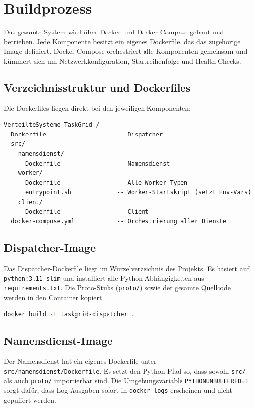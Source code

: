 \section{Buildprozess}
\label{sec:buildprozess}

Das gesamte System wird über Docker und Docker Compose gebaut und betrieben.
Jede Komponente besitzt ein eigenes Dockerfile, das das zugehörige Image definiert.
Docker Compose orchestriert alle Komponenten gemeinsam und kümmert sich um
Netzwerkkonfiguration, Startreihenfolge und Health-Checks.

\subsection{Verzeichnisstruktur und Dockerfiles}

Die Dockerfiles liegen direkt bei den jeweiligen Komponenten:

\begin{lstlisting}[language={},caption={Verzeichnisstruktur der Dockerfiles}]
VerteilteSysteme-TaskGrid-/
  Dockerfile                    -- Dispatcher
  src/
    namensdienst/
      Dockerfile                -- Namensdienst
    worker/
      Dockerfile                -- Alle Worker-Typen
      entrypoint.sh             -- Worker-Startskript (setzt Env-Vars)
    client/
      Dockerfile                -- Client
  docker-compose.yml            -- Orchestrierung aller Dienste
\end{lstlisting}

\subsection{Dispatcher-Image}

Das Dispatcher-Dockerfile liegt im Wurzelverzeichnis des Projekts.
Es basiert auf \texttt{python:3.11-slim} und installiert alle Python-Abhängigkeiten
aus \texttt{requirements.txt}. Die Proto-Stubs (\texttt{proto/}) sowie der
gesamte Quellcode werden in den Container kopiert.

\begin{lstlisting}[language=bash,caption={Image manuell bauen (optional)}]
docker build -t taskgrid-dispatcher .
\end{lstlisting}

\subsection{Namensdienst-Image}

Der Namensdienst hat ein eigenes Dockerfile unter \texttt{src/namensdienst/Dockerfile}.
Es setzt den Python-Pfad so, dass sowohl \texttt{src/} als auch \texttt{proto/}
importierbar sind. Die Umgebungsvariable \texttt{PYTHONUNBUFFERED=1} sorgt dafür,
dass Log-Ausgaben sofort in \texttt{docker logs} erscheinen und nicht gepuffert werden.

